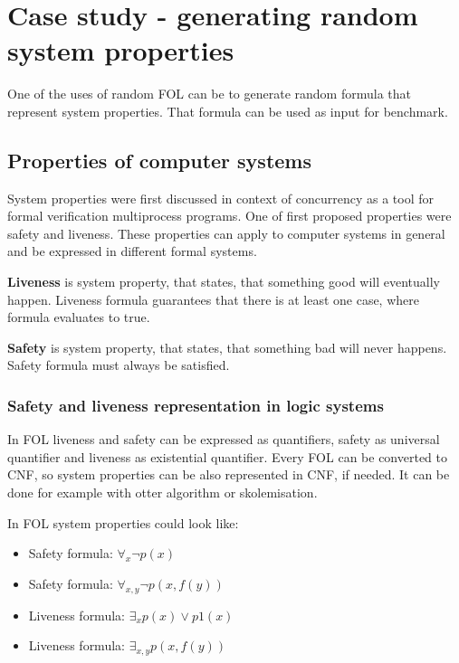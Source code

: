 \chapter{Case study - generating random system properties}

One of the uses of random \gls{FOL} can be to generate random formula that represent system properties. That formula can be used as input for benchmark.

\section{Properties of computer systems}

System properties were first discussed in context of concurrency \cite{Lampert77} as a tool for formal verification multiprocess programs. One of first proposed properties were safety and liveness. These properties can apply to computer systems in general and be expressed in different formal systems.

\textbf{Liveness} \cite{Klimek99} is system property, that states, that something good will eventually happen.
Liveness formula guarantees that there is at least one case, where formula evaluates to true.

\textbf{Safety} \cite{Klimek99} is system property, that states, that something bad will never happens.
Safety formula must always be satisfied.

\subsection{Safety and liveness representation in logic systems}

In \gls{FOL} liveness and safety can be expressed as quantifiers, safety as universal quantifier and liveness as existential quantifier. Every \gls{FOL} can be converted to \gls{CNF}, so system properties can be also represented in \gls{CNF}, if needed. It can be done for example with otter algorithm \cite{McC-Otter-URL} or skolemisation.

In \gls{FOL} system properties could look like:
\begin{itemize}
  \item Safety formula: $\forall_x \neg p(x)$
  \item Safety formula: $\forall_{x,y} \neg p(x,f(y))$ 
  \item Liveness formula: $\exists_x p(x) \lor p1(x)$
  \item Liveness formula: $\exists_{x,y} p(x,f(y))$ 
\end{itemize}

